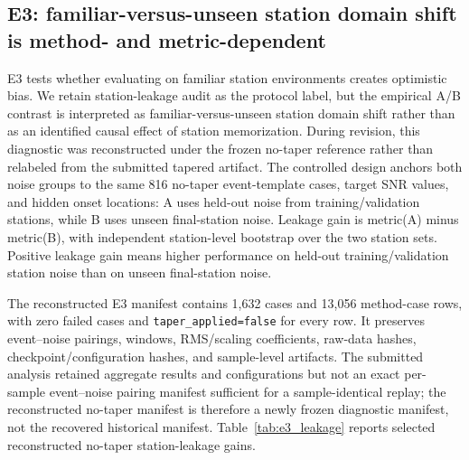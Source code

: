 \documentclass[review,12pt,authoryear]{elsarticle}
\begin{document}
\subsection{E3: familiar-versus-unseen station domain shift is method- and metric-dependent}
\label{sec:e3}
E3 tests whether evaluating on familiar station environments creates optimistic bias. We retain station-leakage audit as the protocol label, but the empirical A/B contrast is interpreted as familiar-versus-unseen station domain shift rather than as an identified causal effect of station memorization. During revision, this diagnostic was reconstructed under the frozen no-taper reference rather than relabeled from the submitted tapered artifact. The controlled design anchors both noise groups to the same 816 no-taper event-template cases, target SNR values, and hidden onset locations: A uses held-out noise from training/validation stations, while B uses unseen final-station noise. Leakage gain is metric(A) minus metric(B), with independent station-level bootstrap over the two station sets. Positive leakage gain means higher performance on held-out training/validation station noise than on unseen final-station noise.

The reconstructed E3 manifest contains 1,632 cases and 13,056 method-case rows, with zero failed cases and \texttt{taper\_applied=false} for every row. It preserves event--noise pairings, windows, RMS/scaling coefficients, raw-data hashes, checkpoint/configuration hashes, and sample-level artifacts. The submitted analysis retained aggregate results and configurations but not an exact per-sample event--noise pairing manifest sufficient for a sample-identical replay; the reconstructed no-taper manifest is therefore a newly frozen diagnostic manifest, not the recovered historical manifest.
Table~\ref{tab:e3_leakage} reports selected reconstructed no-taper station-leakage gains.

\begin{table}[!htbp]
\centering
\caption{E3 reconstructed no-taper station-familiarity/domain-shift diagnostic, interpreted as familiar-versus-unseen station domain-shift contrasts rather than causal station-memorization estimates. Entries are A--B differences, where A uses held-out training/validation-station noise and B uses unseen final-station noise. Intervals are independent station-group bootstrap percentile 95\% CIs with equal station weighting. The Noisy row is the unprocessed-input sanity control; zero-valued gain contrasts are expected by construction where applicable. The Idealized Wiener row uses evaluator-side source decomposition and is included only as a source-aware sensitivity diagnostic; it is not a deployable baseline and is excluded from the principal report-card interpretation. This shared-target diagnostic is not a primary cross-method ranking and is not a historical sample-identical rerun of the submitted tapered E3 experiment.}
\label{tab:e3_leakage}
\small
\resizebox{\linewidth}{!}{%

}
\end{table}
\end{document}
